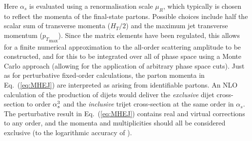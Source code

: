 Here $\alpha_s$ is evaluated using a renormalisation scale $\mu_R$, which
typically is chosen to reflect the momenta of the final-state
partons. Possible choices include half the scalar sum of transverse momenta
($H_T/2$) and the maximum jet transverse momentum (${p_T}_\mathrm{max}$).
Since the matrix elements have been regulated, this allows for a finite numerical approximation to the
all-order scattering amplitude to be constructed, and for this to be integrated
over all of phase space using a Monte Carlo approach (allowing for the application of arbitrary phase space cuts).
Just as for perturbative fixed-order calculations, the parton momenta in
Eq.~(\ref{eq:MHEJ}) are interpreted as arising from identifiable partons. An
NLO calculation of the production of dijets would deliver the \emph{exclusive} dijet
cross-section to order $\alpha_s^3$ and the \emph{inclusive} trijet cross-section
at the same order in $\alpha_s$. The perturbative result in Eq.~(\ref{eq:MHEJ}) contains real
and virtual corrections to any order, and the momenta and multiplicities
should all be considered exclusive (to the logarithmic accuracy of \HEJ).

